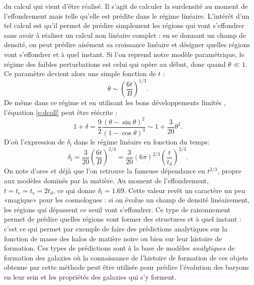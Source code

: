  du calcul qui vient d'être réalisé. Il s'agit de calculer la surdensité au moment de l'effondrement mais telle qu'elle est prédite dans le régime linéaire. L'intérêt d'un tel calcul est qu'il permet de prédire simplement les régions qui vont s'effondrer sans avoir à réaliser un calcul non linéaire complet : en se donnant un champ de densité, on peut prédire aisément sa croissance linéaire et désigner quelles régions vont s'effondrer et à quel instant. Si l'on reprend notre modèle paramétrique, le régime des faibles perturbations est celui qui opère au début, donc quand $\theta \ll 1$. Ce paramètre devient alors une simple fonction de $t$ :
\begin{equation}
\theta \sim \left(\frac{6t}{B}\right)^{1/3}.
\end{equation}
De même dans ce régime et en utilisant les bons développements limités
, l'équation \ref{e:dcoll} peut être réécrite :
\begin{equation}
1+\delta =\frac{9}{2}\frac{(\theta -\sin \theta)^2}{(1-\cos \theta)^3}\sim 1+\frac{3}{20} \theta^2.
\end{equation}
D'où l'expression de $\delta_l$ dans le régime linéaire en fonction du temps:
\begin{equation}
\delta_l=\frac{3}{20}\left(\frac{6t}{B}\right)^{2/3}=\frac{3}{20}(6\pi)^{2/3}\left(\frac{t}{t_d}\right)^{2/3}.
\end{equation}
On note d'ores et déjà que l'on retrouve la fameuse dépendance en $t^{2/3}$, propre aux modèles dominés par la matière. Au moment de l'effondrement, $t=t_e=t_v=2t_d$, ce qui donne $\delta_l=1.69$. Cette valeur revêt un caractère un peu «magique» pour les cosmologues : si on évolue un champ de densité linéairement, les régions qui dépassent ce seuil vont s'effondrer. Ce type de raisonnement permet de prédire quelles régions vont former des structures et à quel instant : c'est ce qui permet par exemple de faire des prédictions analytiques sur la fonction de masse des halos de matière noire ou bien sur leur histoire de formation. Ces types de prédictions sont à la base de modèles \textit{analytiques} de formation des galaxies où la connaissance de l'histoire de formation de ces objets obtenue par cette méthode peut être utilisée pour prédire l'évolution des baryons en leur sein et les propriétés des galaxies qui s'y forment.


